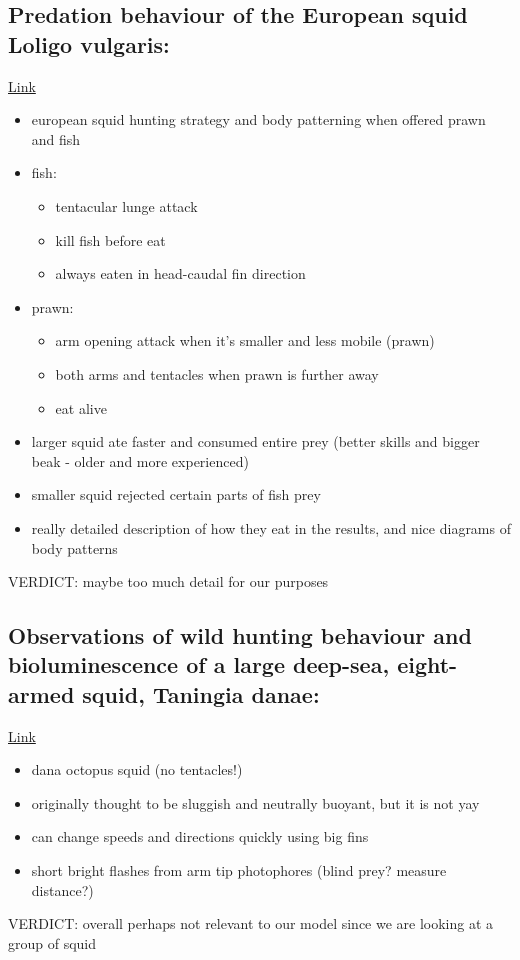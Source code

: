 \documentclass[12pt]{article}
\begin{document}
\subsection{Predation behaviour of the European squid Loligo vulgaris: \cite{castilla}}
\href{https://doi.org/10.1007/s10164-020-00652-4}{Link}
\begin{itemize}
    \item european squid hunting strategy and body patterning when offered prawn and fish
    \item fish:
    \begin{itemize}
        \item tentacular lunge attack
        \item kill fish before eat
        \item always eaten in head-caudal fin direction
    \end{itemize}
    \item prawn:
    \begin{itemize}
        \item arm opening attack when it's smaller and less mobile (prawn)
        \item both arms and tentacles when prawn is further away
        \item eat alive
    \end{itemize}
    \item larger squid ate faster and consumed entire prey (better skills and bigger beak - older and more experienced)
    \item smaller squid rejected certain parts of fish prey
    \item really detailed description of how they eat in the results, and nice diagrams of body patterns
\end{itemize}
VERDICT: maybe too much detail for our purposes

\subsection{Observations of wild hunting behaviour and bioluminescence of a large deep-sea, eight-armed squid, Taningia danae: \cite{kubodera}}
\href{https://doi.org/10.1098/rspb.2006.0236}{Link}
\begin{itemize}
    \item dana octopus squid (no tentacles!)
    \item originally thought to be sluggish and neutrally buoyant, but it is not yay
    \item can change speeds and directions quickly using big fins
    \item short bright flashes from arm tip photophores (blind prey? measure distance?)
\end{itemize}
VERDICT: overall perhaps not relevant to our model since we are looking at a group of squid
\end{document}
